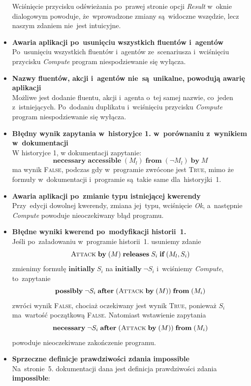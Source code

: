 \documentclass[11pt,a4paper]{article}
\begin{document}
\begin{itemize}
    Wciśnięcie przycisku odświeżania po~prawej stronie opcji \emph{Result} w~oknie dialogowym powoduje, że~wprowadzone zmiany są~widoczne wszędzie, lecz naszym zdaniem nie~jest intuicyjne.
    \item \textbf{Awaria aplikacji po~usunięciu wszystkich fluentów i~agentów} \\
    Po~usunięciu wszystkich fluentów i~agentów ze~scenariusza i~wciśnięciu przycisku \emph{Compute} program niespodziewanie się wyłącza.
    \item \textbf{Nazwy fluentów, akcji i~agentów nie~są~unikalne, powodują awarię aplikacji} \\
    Możliwe jest dodanie fluentu, akcji i~agenta o~tej samej nazwie, co~jeden z~istniejących.
    Po~dodaniu duplikatu i~wciśnięciu przycisku \emph{Compute} program niespodziewanie się wyłącza.
    \item \textbf{Błędny wynik zapytania w~historyjce 1. w~porównaniu z~wynikiem w~dokumentacji} \\
    W historyjce 1, w dokumentacji zapytanie: 
    $$\textbf{necessary accessible} \; (M_l) \; \textbf{from} \; (\neg M_l) \; \textbf{by} \; {M}$$
    ma wynik \textsc{False}, podczas gdy w~programie zwrócone jest \textsc{True}, mimo że formuły w~dokumentacji i~programie są~takie same dla~historyjki~1.
    \item \textbf{Awaria aplikacji po~zmianie typu istniejącej kwerendy} \\
    Przy~edycji dowolnej kwerendy, zmiana jej~typu, wciśnięcie \emph{Ok}, a~następnie \emph{Compute} powoduje nieoczekiwany błąd programu.
    \item \textbf{Błędne wyniki kwerend po~modyfikacji historii~1.} \\
    Jeśli po~załadowaniu w~programie historii~1. usuniemy zdanie
    $$\textsc{Attack} \; \textbf{by} \; (M) \; \textbf{releases} \; S_i \; \textbf{if} \; (M_l, S_i) $$
    zmienimy formułę $ \textbf{initially} \; S_i $ na $ \textbf{initially} \; \neg S_i $ i~wciśniemy \emph{Compute}, to~zapytanie
    $$ \textbf{possibly} \; \neg S_i \; \textbf{after} \; (\textsc{Attack} \; \textbf{by} \; (M)) \; \textbf{from} \; (M_i) $$
    zwróci wynik \textsc{False}, chociaż oczekiwany jest wynik \textsc{True}, ponieważ $S_i$ ma~wartość początkową \textsc{False}.
    Natomiast wstawienie zapytania
    $$ \textbf{necessary} \; \neg S_i \; \textbf{after} \; (\textsc{Attack} \; \textbf{by} \; (M)) \; \textbf{from} \; (M_i) $$
    powoduje nieoczekiwane zakończenie programu.
    \item \textbf{Sprzeczne definicje prawdziwości zdania impossible} \\
    Na~stronie~5. dokumentacji dana jest definicja prawdziwości zdania \textbf{impossible}:


\end{itemize}
\end{document}
